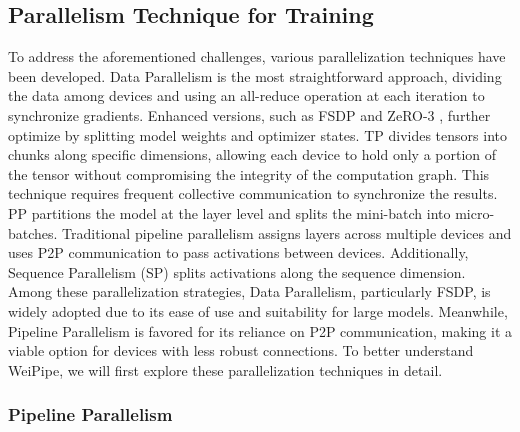 \documentclass[sigplan,review,anonymous]{acmart}
\begin{document}
\subsection{Parallelism Technique for Training}
To address the aforementioned challenges, various parallelization techniques have been developed. Data Parallelism is the most straightforward approach, dividing the data among devices and using an all-reduce operation at each iteration to synchronize gradients. Enhanced versions, such as FSDP \cite{zhao2023pytorchfsdpexperiencesscaling} and ZeRO-3 \cite{rajbhandari2020zeromemoryoptimizationstraining}, further optimize by splitting model weights and optimizer states.
TP \cite{shoeybi2019megatron, xu2021efficient, wang2022tesseract, li2023automatedtensormodelparallelism, cheng2023atpadaptivetensorparallelism} divides tensors into chunks along specific dimensions, allowing each device to hold only a portion of the tensor without compromising the integrity of the computation graph. This technique requires frequent collective communication to synchronize the results.
PP \cite{gems, gpipe, dapple, li2021chimera, hanayo, qi2023zerobubblepipelineparallelism} partitions the model at the layer level and splits the mini-batch into micro-batches. Traditional pipeline parallelism assigns layers across multiple devices and uses P2P communication to pass activations between devices.
Additionally, Sequence Parallelism (SP) \cite{jacobs2023Ulysses, liu2023ring, gu2024loongtrainefficienttraininglongsequence, li2022sequence, liu2024wallfacerguidingtransformermodel} splits activations along the sequence dimension. Among these parallelization strategies, Data Parallelism, particularly FSDP, is widely adopted due to its ease of use and suitability for large models. Meanwhile, Pipeline Parallelism is favored for its reliance on P2P communication, making it a viable option for devices with less robust connections. To better understand WeiPipe, we will first explore these parallelization techniques in detail.

\subsubsection{Pipeline Parallelism}
\end{document}
